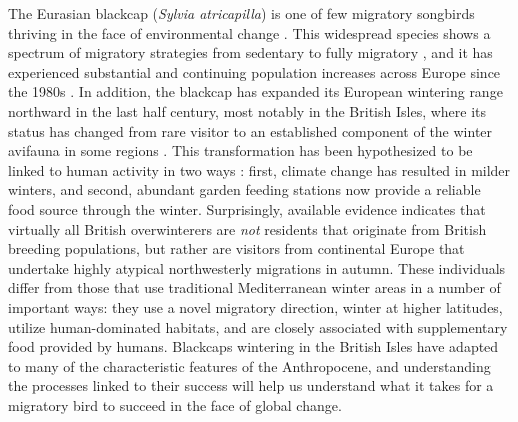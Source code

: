 \documentclass[a4paper, nobind]{templates/ociamthesis}
\begin{document}
The Eurasian blackcap (\emph{Sylvia atricapilla}) is one of few migratory songbirds thriving in the face of environmental change \autocite{ebcc/birdlife/rspb/csoTrendsCommonBirds2018}. This widespread species shows a spectrum of migratory strategies from sedentary to fully migratory \autocite{crampSylviaAtricapillaBlackcap1992}, and it has experienced substantial and continuing population increases across Europe since the 1980s \autocite{ebcc/birdlife/rspb/csoTrendsCommonBirds2018}. In addition, the blackcap has expanded its European wintering range northward in the last half century, most notably in the British Isles, where its status has changed from rare visitor to an established component of the winter avifauna in some regions \autocite{franssonWinteringBlackcapsSylvia1994,fouargePointCasHivernage1980,johansenVinterforekomstAfMunk2002,bearhopAssortativeMatingMechanism2005,bertholdMigratoryBehaviourPopulation1988,bertholdRapidMicroevolutionMigratory1992,leachWinteringBlackcapsBritain1981}. This transformation has been hypothesized to be linked to human activity in two ways \autocite{bertholdMigratoryBehaviourPopulation1988,plummerSupplementaryFeedingGardens2015}: first, climate change has resulted in milder winters, and second, abundant garden feeding stations now provide a reliable food source through the winter. Surprisingly, available evidence \autocites[Chapter \ref{blackcap-geo};][]{bertholdRapidMicroevolutionMigratory1992}{plummerSupplementaryFeedingGardens2015}{wernhamMigrationAtlasMovements2002} indicates that virtually all British overwinterers are \emph{not} residents that originate from British breeding populations, but rather are visitors from continental Europe that undertake highly atypical northwesterly migrations in autumn. These individuals differ from those that use traditional Mediterranean winter areas in a number of important ways: they use a novel migratory direction, winter at higher latitudes, utilize human-dominated habitats, and are closely associated with supplementary food provided by humans. Blackcaps wintering in the British Isles have adapted to many of the characteristic features of the Anthropocene, and understanding the processes linked to their success will help us understand what it takes for a migratory bird to succeed in the face of global change.
\end{document}
